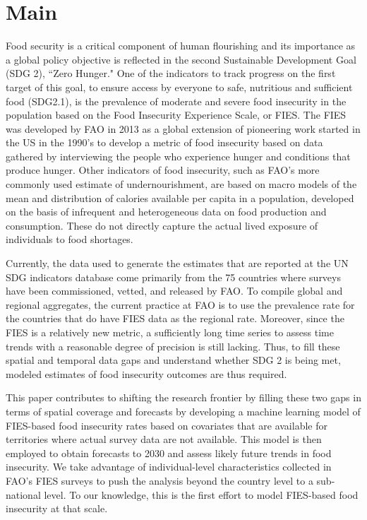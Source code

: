 \documentclass{article}
\begin{document}
\section{Main}
Food security is a critical component of human flourishing and its importance as a global policy objective is reflected in the second Sustainable Development Goal (SDG 2), ``Zero Hunger." One of the indicators to track progress on the first target of this goal, to ensure access by everyone to safe, nutritious and sufficient food (SDG2.1), is the prevalence of moderate and severe food insecurity in the population based on the Food Insecurity Experience Scale, or FIES. The FIES was developed by FAO in 2013 as a global extension of pioneering work started in the US in the 1990's to develop a metric of food insecurity based on data gathered by interviewing the people who experience hunger and conditions that produce hunger. Other indicators of food insecurity, such as FAO's more commonly used estimate of undernourishment, are based on macro models of the mean and distribution of calories available per capita in a population, developed on the basis of infrequent and heterogeneous data on food production and consumption. These do not directly capture the actual lived exposure of individuals to food shortages. 

Currently, the data used to generate the estimates that are reported at the UN SDG indicators database come primarily from the 75 countries where surveys have been commissioned, vetted, and released by FAO. To compile global and regional aggregates, the current practice at FAO is to use the prevalence rate for the countries that do have FIES data as the regional rate.  Moreover, since the FIES is a relatively new metric, a sufficiently long time series to assess time trends with a reasonable degree of precision is still lacking. Thus, to fill these spatial and temporal data gaps and understand whether SDG 2 is being met, modeled estimates of food insecurity outcomes are thus required.

This paper contributes to shifting the research frontier by filling these two gaps in terms of spatial coverage and forecasts by developing a machine learning model of FIES-based food insecurity rates based on covariates that are available for territories where actual survey data are not available. This model is then employed to obtain forecasts to 2030 and assess likely future trends in food insecurity. We take advantage of individual-level characteristics collected in FAO's FIES surveys to push the analysis beyond the country level to a sub-national level. To our knowledge, this is the first effort to model FIES-based food insecurity at that scale.
\end{document}
